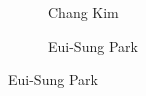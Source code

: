 \begin{frame}[plain]
\begin{figure}[h]
\begin{subfigure}{0.3\textwidth}
	\caption{Chang Kim}
	\end{subfigure}
	\begin{subfigure}{0.3\textwidth}
	\captionsetup{labelformat=empty}
	\centering
	\caption{\hspace{0cm}Eui-Sung Park}
	\end{subfigure}
	\end{figure}
\end{frame}


